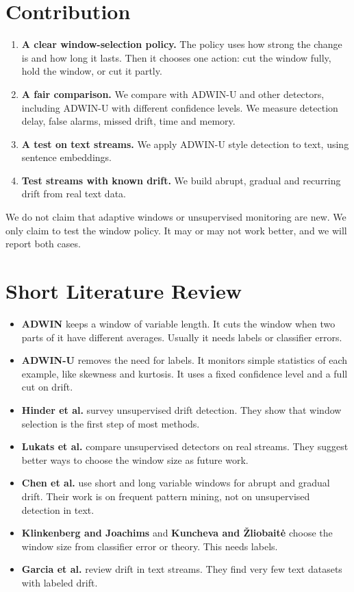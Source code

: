 \documentclass[11pt,a4paper]{article}
\begin{document}
\section{Contribution}

\begin{enumerate}[label=\textbf{C\arabic*.}]
\item \textbf{A clear window-selection policy.} The policy uses how strong the change is and how long it lasts. Then it chooses one action: cut the window fully, hold the window, or cut it partly.
\item \textbf{A fair comparison.} We compare with ADWIN-U and other detectors, including ADWIN-U with different confidence levels. We measure detection delay, false alarms, missed drift, time and memory.
\item \textbf{A test on text streams.} We apply ADWIN-U style detection to text, using sentence embeddings.
\item \textbf{Test streams with known drift.} We build abrupt, gradual and recurring drift from real text data.
\end{enumerate}

We do not claim that adaptive windows or unsupervised monitoring are new. We only claim to test the window policy. It may or may not work better, and we will report both cases.

\section{Short Literature Review}

\begin{itemize}
\item \textbf{ADWIN} \cite{bifet2007} keeps a window of variable length. It cuts the window when two parts of it have different averages. Usually it needs labels or classifier errors.
\item \textbf{ADWIN-U} \cite{assis2025} removes the need for labels. It monitors simple statistics of each example, like skewness and kurtosis. It uses a fixed confidence level and a full cut on drift.
\item \textbf{Hinder et al.} \cite{hinder2024} survey unsupervised drift detection. They show that window selection is the first step of most methods.
\item \textbf{Lukats et al.} \cite{lukats2025} compare unsupervised detectors on real streams. They suggest better ways to choose the window size as future work.
\item \textbf{Chen et al.} \cite{chen2024} use short and long variable windows for abrupt and gradual drift. Their work is on frequent pattern mining, not on unsupervised detection in text.
\item \textbf{Klinkenberg and Joachims} \cite{klinkenberg2000} and \textbf{Kuncheva and \v{Z}liobait\.{e}} \cite{kuncheva2009} choose the window size from classifier error or theory. This needs labels.
\item \textbf{Garcia et al.} \cite{garcia2024} review drift in text streams. They find very few text datasets with labeled drift.
\end{itemize}
\end{document}
